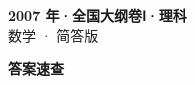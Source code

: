 \documentclass[zihao=-4, a4paper]{ctexart}
\begin{document}
\begin{center}
  {\Large\bfseries 2007 年·全国大纲卷Ⅰ·理科}\\[4pt]
  {\large 数学 · 简答版}
\end{center}
\medskip
{}

\clearpage
{}
\begin{center}{\Large\bfseries 答案速查}\end{center}
\medskip

\end{document}

